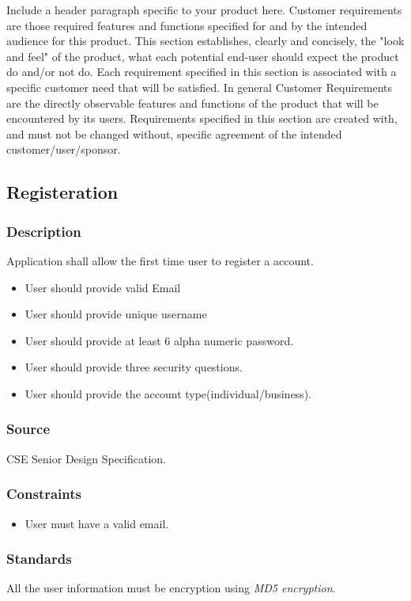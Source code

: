 Include a header paragraph specific to your product here. Customer requirements are those required features and functions specified for and by the intended audience for this product. This section establishes, clearly and concisely, the "look and feel" of the product, what each potential end-user should expect the product do and/or not do. Each requirement specified in this section is associated with a specific customer need that will be satisfied. In general Customer Requirements are the directly observable features and functions of the product that will be encountered by its users. Requirements specified in this section are created with, and must not be changed without, specific agreement of the intended customer/user/sponsor.

\subsection{Registeration}
\subsubsection{Description}
Application shall allow the first time user to register a account.
\begin{itemize}
\item User should provide valid Email
\item User should provide unique username
\item User should provide at least 6 alpha numeric password.
\item User should provide three security questions.
\item User should provide the account type(individual/business).
\end{itemize}

\subsubsection{Source}
CSE Senior Design Specification.
\subsubsection{Constraints}
\begin{itemize}
\item User must have a valid email. 
\end{itemize}

\subsubsection{Standards}
All the user information must be encryption using \textit{MD5 encryption}.
